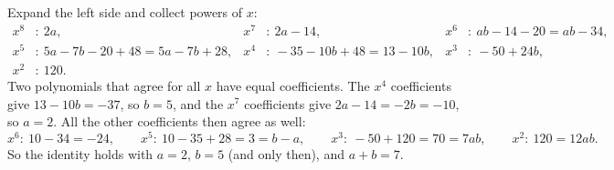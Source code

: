 Expand the left side and collect powers of $x$:
\begin{align*}
x^8&:\ 2a, & x^7&:\ 2a-14, & x^6&:\ ab-14-20=ab-34,\\
x^5&:\ 5a-7b-20+48=5a-7b+28, & x^4&:\ -35-10b+48=13-10b, & x^3&:\ -50+24b,\\
x^2&:\ 120. &&&&
\end{align*}
Two polynomials that agree for all $x$ have equal coefficients. The $x^4$ coefficients give $13-10b=-37$, so $b=5$, and the $x^7$ coefficients give $2a-14=-2b=-10$, so $a=2$. All the other coefficients then agree as well:
\[x^6:\ 10-34=-24,\qquad x^5:\ 10-35+28=3=b-a,\qquad x^3:\ -50+120=70=7ab,\qquad x^2:\ 120=12ab.\]
So the identity holds with $a=2$, $b=5$ (and only then), and $a+b=\boxed{7}$.
